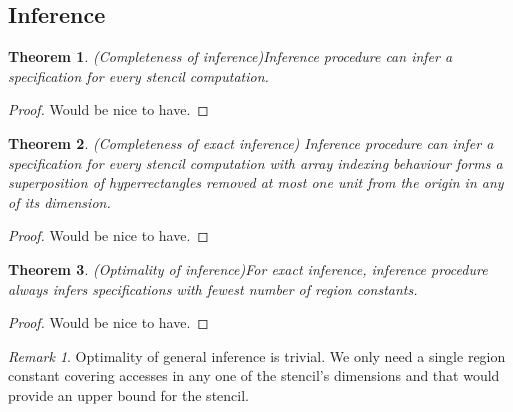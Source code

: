 \documentclass[acmlarge,review]{acmart}
\theoremstyle{definition}
\theoremstyle{plain}
\newtheorem{thm}{Theorem}
\theoremstyle{remark}
\newtheorem{remark}{Remark}
\begin{document}
\subsection{Inference}

\begin{thm}{(Completeness of inference)}\label{thm:inf-completeness}
  Inference procedure can infer a specification for every stencil computation.
\end{thm}
%
\begin{proof}
  Would be nice to have.
\end{proof}

\begin{thm}{(Completeness of exact inference)}
  Inference procedure can infer a specification for every stencil computation
  with array indexing behaviour forms a superposition of hyperrectangles removed
  at most one unit from the origin in any of its dimension.
\end{thm}
%
\begin{proof}
  Would be nice to have.
\end{proof}

\begin{thm}{(Optimality of inference)}\label{thm:inf-optimality}
  For exact inference, inference procedure always infers specifications with
  fewest number of region constants.
\end{thm}
%
\begin{proof}
  Would be nice to have.
\end{proof}

\begin{remark}{}
  Optimality of general inference is trivial. We only need a single region
  constant covering accesses in any one of the stencil's dimensions and that
  would provide an upper bound for the stencil.
\end{remark}
\end{document}
